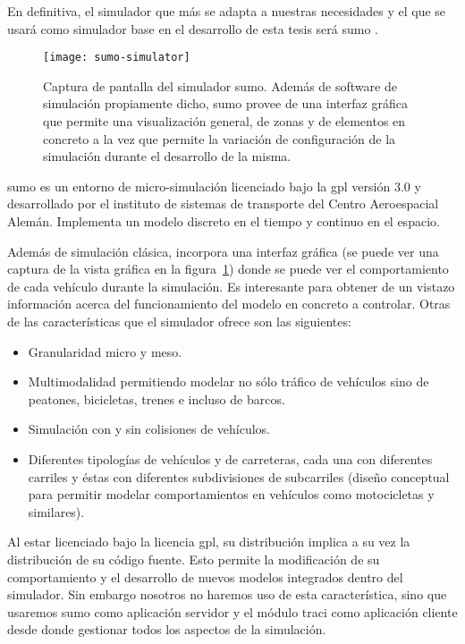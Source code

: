 En definitiva, el simulador que más se adapta a nuestras necesidades y el que se usará como simulador base en el desarrollo de esta tesis será \gls{sumo} \cite{krajzewicz2002sumo, behrisch2011sumo, krajzewicz2012recent}.

\begin{figure}[!b]
	\texttt{[image: sumo-simulator]}
	\caption[Captura de pantalla del simulador \gls{sumo}]{Captura de pantalla del simulador \gls{sumo}. Además de software de simulación propiamente dicho, \gls{sumo} provee de una interfaz gráfica que permite una visualización general, de zonas y de elementos en concreto a la vez que permite la variación de configuración de la simulación durante el desarrollo de la misma.}
	\label{fig:sumo-simulator}
\end{figure}

\gls{sumo} es un entorno de micro-simulación licenciado bajo la \gls{gpl} versión $3$.$0$ y desarrollado por el instituto de sistemas de transporte del Centro Aeroespacial Alemán. Implementa un modelo discreto en el tiempo y continuo en el espacio.

Además de simulación clásica, incorpora una interfaz gráfica (se puede ver una captura de la vista gráfica en la figura~\ref{fig:sumo-simulator}) donde se puede ver el comportamiento de cada vehículo durante la simulación. Es interesante para obtener de un vistazo información acerca del funcionamiento del modelo en concreto a controlar. Otras de las características que el simulador ofrece son las siguientes:

\begin{itemize}
	\item Granularidad micro y meso.
	\item Multimodalidad permitiendo modelar no sólo tráfico de vehículos sino de peatones, bicicletas, trenes e incluso de barcos.
	\item Simulación con y sin colisiones de vehículos.
	\item Diferentes tipologías de vehículos y de carreteras, cada una con diferentes carriles y éstas con diferentes subdivisiones de subcarriles (diseño conceptual para permitir modelar comportamientos en vehículos como motocicletas y similares).
\end{itemize}

Al estar licenciado bajo la licencia \gls{gpl}, su distribución implica a su vez la distribución de su código fuente. Esto permite la modificación de su comportamiento y el desarrollo de nuevos modelos integrados dentro del simulador. Sin embargo nosotros no haremos uso de esta característica, sino que usaremos \gls{sumo} como aplicación servidor y el módulo \gls{traci} como aplicación cliente desde donde gestionar todos los aspectos de la simulación.

